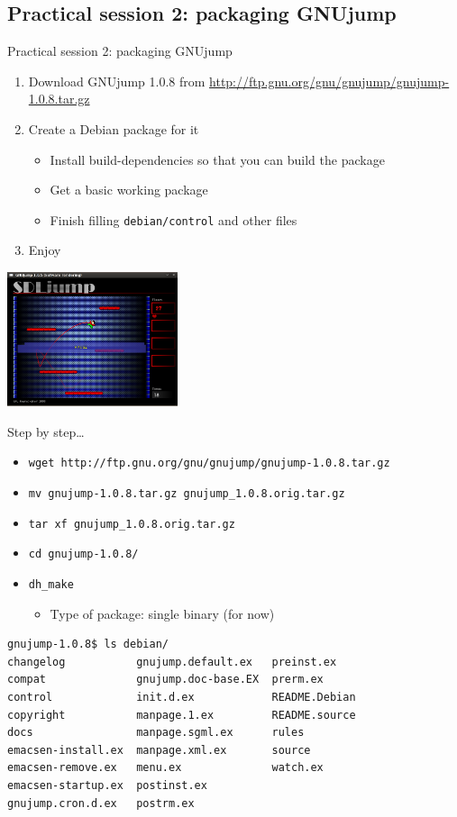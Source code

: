 \documentclass[10pt,final]{beamer}
\begin{document}
\subsection{Practical session 2: packaging GNUjump}
\begin{frame}{Practical session 2: packaging GNUjump}
\begin{enumerate}
	\item Download GNUjump 1.0.8 from
		\url{http://ftp.gnu.org/gnu/gnujump/gnujump-1.0.8.tar.gz}
		\br
	\item Create a Debian package for it
		\begin{itemize}
			\item Install build-dependencies so that you can build the package
			\item Get a basic working package
			\item Finish filling \texttt{debian/control} and other files
		\end{itemize}
		\br
	\item Enjoy
\end{enumerate}
\centerline{\includegraphics[width=5cm]{figs/gnujump.png}}
\end{frame}

\begin{frame}[fragile]{Step by step\ldots}
\begin{itemize}
	\item \texttt{wget http://ftp.gnu.org/gnu/gnujump/gnujump-1.0.8.tar.gz}
		\hbr
	\item \texttt{mv gnujump-1.0.8.tar.gz gnujump\_1.0.8.orig.tar.gz}
		\hbr
	\item \texttt{tar xf gnujump\_1.0.8.orig.tar.gz}
		\hbr
	\item \texttt{cd gnujump-1.0.8/}
		\hbr
	\item \texttt{dh\_make}
	\begin{itemize}
		\item \small Type of package: single binary (for now)
	\end{itemize}
\end{itemize}
\begin{lstlisting}[basicstyle=\ttfamily\small]
gnujump-1.0.8$ ls debian/
changelog           gnujump.default.ex   preinst.ex
compat              gnujump.doc-base.EX  prerm.ex
control             init.d.ex            README.Debian
copyright           manpage.1.ex         README.source
docs                manpage.sgml.ex      rules
emacsen-install.ex  manpage.xml.ex       source
emacsen-remove.ex   menu.ex              watch.ex
emacsen-startup.ex  postinst.ex
gnujump.cron.d.ex   postrm.ex
\end{lstlisting}
\end{frame}
\end{document}
